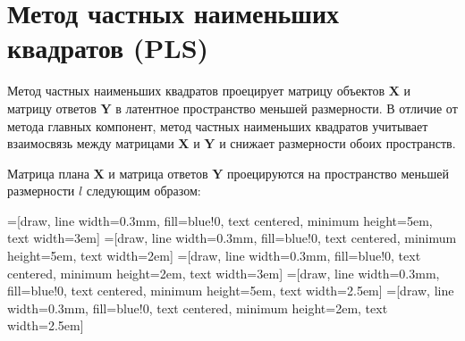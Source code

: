\documentclass[12pt,twoside]{article}
\newcommand{\bY}{\mathbf{Y}}
\newcommand{\bX}{\mathbf{X}}
\begin{document}
\section{Метод частных наименьших квадратов (PLS)}

Метод частных наименьших квадратов проецирует матрицу объектов $\bX$ и матрицу ответов $\bY$ в латентное пространство меньшей размерности. В отличие от метода главных компонент, метод частных наименьших квадратов учитывает взаимосвязь между матрицами $\bX$ и $\bY$ и снижает размерности обоих пространств.

Матрица плана $\bX$ и матрица ответов $\bY$ проецируются на пространство меньшей размерности $l$ следующим образом:




=[draw, line width=0.3mm, fill=blue!0, text centered, minimum height=5em, text width=3em]
=[draw, line width=0.3mm, fill=blue!0, text centered, minimum height=5em, text width=2em]
=[draw, line width=0.3mm, fill=blue!0, text centered, minimum height=2em, text width=3em]
=[draw, line width=0.3mm, fill=blue!0, text centered, minimum height=5em, text width=2.5em]
=[draw, line width=0.3mm, fill=blue!0, text centered, minimum height=2em, text width=2.5em]
\end{document}
